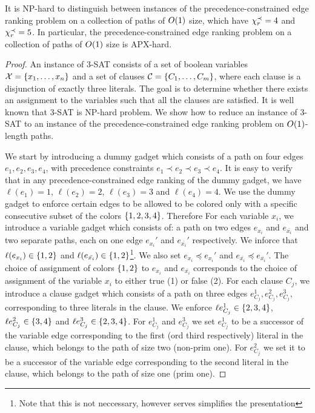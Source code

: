 \begin{theorem}
\label{thm:apx-hardness}
It is NP-hard to distinguish between instances of the precedence-constrained edge ranking problem on a collection of paths of $O\mathopen{}\left( 1 \right)$ size, which have $\chi_r^{\prec}=4$ and  $\chi_r^{\prec}=5$. In particular, the precedence-constrained edge ranking problem on a collection of paths of $O\mathopen{}\left( 1 \right)$ size is APX-hard.
\end{theorem}
\begin{proof}
    An instance of 3-SAT consists of a set of boolean variables $\mathcal{X}=\mathopen{}\left\{ x_1, \ldots, x_n \right\}$ and a set of clauses $\mathcal{C}=\mathopen{}\left\{ C_1, \ldots, C_m \right\}$, where each clause is a disjunction of exactly three literals. The goal is to determine whether there exists an assignment to the variables such that all the clauses are satisfied. It is well known that 3-SAT is NP-hard problem. We show how to reduce an instance of 3-SAT to an instance of the precedence-constrained edge ranking problem on $O\mathopen{}\left( 1 \right)$-length paths.
    
    We start by introducing a dummy gadget which consists of a path on four edges $e_1,e_2,e_3,e_4$, with precedence constraints $e_1\prec e_2\prec e_3\prec e_4$. It is easy to verify that in any precedence-constrained edge ranking of the dummy gadget, we have $\ell(e_1)=1$, $\ell(e_2)=2$, $\ell(e_3)=3$ and $\ell(e_4)=4$. We use the dummy gadget to enforce certain edges to be allowed to be colored only with a specific consecutive subset of the colors $\mathopen{}\left\{ 1,2,3,4 \right\}$. Therefore
    For each variable $x_i$, we introduce a variable gadget which consists of: a path on two edges $e_{x_i}$ and $e_{\bar{x_i}}$ and two separate paths, each on one edge $e_{x_i}'$ and $e_{\bar{x_i}}'$ respectively. We inforce that $\ell\mathopen{}\left( e_{x_i} \right)\in \mathopen{}\left\{ 1,2 \right\}$ and $\ell\mathopen{}\left( e_{\bar{x_i}} \right)\in \mathopen{}\left\{ 1,2 \right\}$\footnote{Note that this is not neccessary, however serves simplifies the presentation}. We also set $e_{x_i}\preceq e_{x_i}'$ and $e_{\bar{x_i}}\preceq e_{\bar{x_i}}'$. The choice of assignment of colors $\mathopen{}\left\{ 1,2 \right\}$ to $e_{x_i}$ and $e_{\bar{x_i}}$ corresponds to the choice of assignment of the variable $x_i$ to either true (1) or false (2). For each clause $C_j$, we introduce a clause gadget which consists of a path on three edges $e_{C_j}^1,e_{C_j}^2,e_{C_j}^3$, corresponding to three literals in the clause. We enforce $\ell{e_{C_j}^1}\in \mathopen{}\left\{ 2,3,4 \right\}$, $\ell{e_{C_j}^2}\in \mathopen{}\left\{ 3,4 \right\}$ and $\ell{e_{C_j}^3}\in \mathopen{}\left\{ 2,3,4 \right\}$. For $e_{C_j}^1$ and $e_{C_j}^3$ we set $e_{C_j}^1$ to be a successor of the variable edge corresponding to the first (ord third respectively) literal in the clause, which belongs to the path of size two (non-prim one). For $e_{C_j}^2$ we set it to be a successor of the variable edge corresponding to the second literal in the clause, which belongs to the path of size one (prim one). 


\end{proof}
